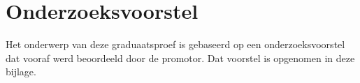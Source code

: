 \documentclass[english,dit,thesis]{hogentreport}
\begin{document}





%
%




\appendix

\chapter{Onderzoeksvoorstel}

Het onderwerp van deze graduaatsproef is gebaseerd op een onderzoeksvoorstel dat vooraf werd beoordeeld door de promotor. Dat voorstel is opgenomen in deze bijlage.





%


\backmatter{}

\setlength\bibitemsep{2pt} %
\printbibliography[heading=bibintoc]
\end{document}
